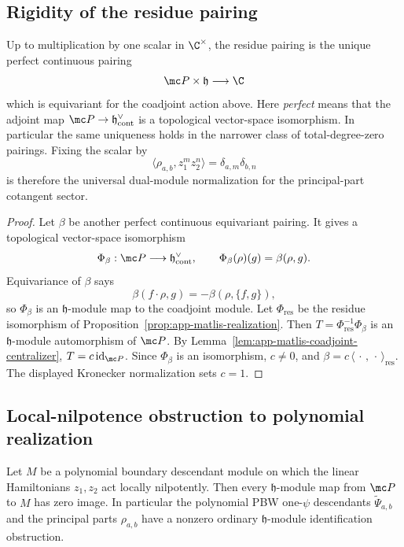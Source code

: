 \subsection{Rigidity of the residue pairing}
\label{ssec:app-matlis-rigidity}

\begin{thm}
\label{thm:app-matlis-residue-rigidity}
  Up to multiplication by one scalar in \(\C^\times\), the residue
  pairing is the unique perfect continuous pairing
  \[
    \mc P\times\mathfrak h\longrightarrow\C
  \]
  which is equivariant for the coadjoint action above.  Here
  \emph{perfect} means that the adjoint map
  \(\mc P\to\mathfrak h^\vee_{\mathrm{cont}}\) is a topological
  vector-space isomorphism.  In particular the same uniqueness holds in
  the narrower class of total-degree-zero pairings.  Fixing the scalar by
  \[
    \langle\rho_{a,b},z_1^m z_2^n\rangle
      =\delta_{a,m}\delta_{b,n}
  \]
  is therefore the universal dual-module normalization for the
  principal-part cotangent sector.
\end{thm}

\begin{proof}
  Let \(\beta\) be another perfect continuous equivariant pairing.  It
  gives a topological vector-space isomorphism
  \[
    \Phi_\beta:\mc P\longrightarrow\mathfrak h^\vee_{\mathrm{cont}},
    \qquad
    \Phi_\beta(\rho)(g)=\beta(\rho,g).
  \]
  Equivariance of \(\beta\) says
  \[
    \beta(f\cdot\rho,g)=-\beta(\rho,\{f,g\}),
  \]
  so \(\Phi_\beta\) is an \(\mathfrak h\)-module map to the coadjoint
  module.  Let \(\Phi_{\mathrm{res}}\) be the residue isomorphism of
  Proposition~\ref{prop:app-matlis-realization}.  Then
  \(T=\Phi_{\mathrm{res}}^{-1}\Phi_\beta\) is an \(\mathfrak h\)-module
  automorphism of \(\mc P\).  By
  Lemma~\ref{lem:app-matlis-coadjoint-centralizer},
  \(T=c\,\mathrm{id}_{\mc P}\).  Since \(\Phi_\beta\) is an isomorphism,
  \(c\neq0\), and
  \(\beta=c\,\langle\,\cdot\,,\,\cdot\,\rangle_{\mathrm{res}}\).  The
  displayed Kronecker normalization sets \(c=1\).
\end{proof}

\subsection{Local-nilpotence obstruction to polynomial realization}
\label{ssec:app-matlis-polynomial-obstruction}

\begin{thm}
\label{thm:app-matlis-polynomial-descendant-obstruction}
  Let \(M\) be a polynomial boundary descendant module on which the
  linear Hamiltonians \(z_1,z_2\) act locally nilpotently.  Then
  every \(\mathfrak h\)-module map from \(\mc P\) to \(M\) has zero image.
  In particular the polynomial PBW one-\(\psi\) descendants
  \(\widetilde\Psi_{a,b}\) and the principal parts \(\rho_{a,b}\) have a
  nonzero ordinary \(\mathfrak h\)-module identification obstruction.
\end{thm}

